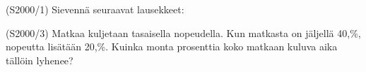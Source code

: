\begin{tehtava}(S2000/1)   Sievennä seuraavat lausekkeet:
                        \begin{alakohdat}
                        \end{alakohdat}
\end{tehtava}

\begin{tehtava}(S2000/3)   Matkaa kuljetaan tasaisella nopeudella. Kun matkasta on
                        jäljellä 40,\%, nopeutta lisätään 20,\%. Kuinka monta
                        prosenttia koko matkaan kuluva aika tällöin lyhenee?
\end{tehtava}


